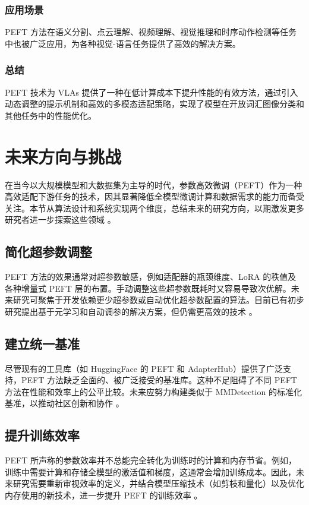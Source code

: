 \documentclass[12pt,a4paper,twoside]{article} %
\begin{document}
\begin{multicols}{2}
\subsubsection{应用场景}
PEFT 方法在语义分割、点云理解、视频理解、视觉推理和时序动作检测等任务中也被广泛应用，为各种视觉-语言任务提供了高效的解决方案。

\subsubsection{总结}
PEFT 技术为 VLAs 提供了一种在低计算成本下提升性能的有效方法，通过引入动态调整的提示机制和高效的多模态适配策略，实现了模型在开放词汇图像分类和其他任务中的性能优化。


\section{未来方向与挑战}

在当今以大规模模型和大数据集为主导的时代，参数高效微调（PEFT）作为一种高效适配下游任务的技术，因其显著降低全模型微调计算和数据需求的能力而备受关注。本节从算法设计和系统实现两个维度，总结未来的研究方向，以期激发更多研究者进一步探索这些领域 \cite{peft_survey}。

\subsection{简化超参数调整}
PEFT 方法的效果通常对超参数敏感，例如适配器的瓶颈维度、LoRA 的秩值及各种增量式 PEFT 层的布置。手动调整这些超参数既耗时又容易导致次优解。未来研究可聚焦于开发依赖更少超参数或自动优化超参数配置的算法。目前已有初步研究提出基于元学习和自动调参的解决方案，但仍需更高效的技术 \cite{hyperparam_tuning1, hyperparam_tuning2}。

\subsection{建立统一基准}
尽管现有的工具库（如 HuggingFace 的 PEFT 和 AdapterHub）提供了广泛支持，PEFT 方法缺乏全面的、被广泛接受的基准库。这种不足阻碍了不同 PEFT 方法在性能和效率上的公平比较。未来应努力构建类似于 MMDetection 的标准化基准，以推动社区创新和协作 \cite{huggingface_peft, adapterhub}。

\subsection{提升训练效率}
PEFT 所声称的参数效率并不总能完全转化为训练时的计算和内存节省。例如，训练中需要计算和存储全模型的激活值和梯度，这通常会增加训练成本。因此，未来研究需要重新审视效率的定义，并结合模型压缩技术（如剪枝和量化）以及优化内存使用的新技术，进一步提升 PEFT 的训练效率 \cite{memory_efficiency1, memory_efficiency2}。


\end{multicols}
\end{document}

